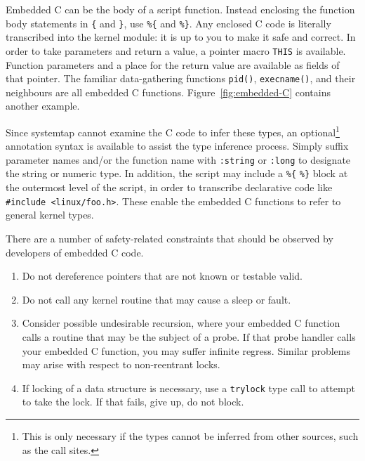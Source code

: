 \documentclass{article}
\begin{document}
Embedded C can be the body of a script function.  Instead enclosing
the function body statements in \verb+{+ and \verb+}+, use \verb+%{+
and \verb+%}+.  Any enclosed C code is literally transcribed into the
kernel module: it is up to you to make it safe and correct.  In order
to take parameters and return a value, a pointer macro \verb+THIS+ is
available.  Function parameters and a place for the return value are
available as fields of that pointer.  The familiar data-gathering
functions \verb+pid()+, \verb+execname()+, and their neighbours are
all embedded C functions.  Figure~\ref{fig:embedded-C} contains
another example.

Since systemtap cannot examine the C code to infer these types, an
optional\footnote{This is only necessary if the types cannot be
inferred from other sources, such as the call sites.} annotation
syntax is available to assist the type inference process.  Simply
suffix parameter names and/or the function name with \verb+:string+ or
\verb+:long+ to designate the string or numeric type.  In addition,
the script may include a \verb+%{+ \verb+%}+ block at the outermost
level of the script, in order to transcribe declarative code like
\verb+#include <linux/foo.h>+.  These enable the embedded C functions
to refer to general kernel types.

There are a number of safety-related constraints that should be
observed by developers of embedded C code.
\begin{enumerate}
\item Do not dereference pointers that are not known or testable valid.
\item Do not call any kernel routine that may cause a sleep or fault.
\item Consider possible undesirable recursion, where your embedded C
function calls a routine that may be the subject of a probe.  If that
probe handler calls your embedded C function, you may suffer infinite
regress.  Similar problems may arise with respect to non-reentrant
locks.
\item If locking of a data structure is necessary, use a
\verb+trylock+ type call to attempt to take the lock.  If that fails,
give up, do not block.
\end{enumerate}
\end{document}
